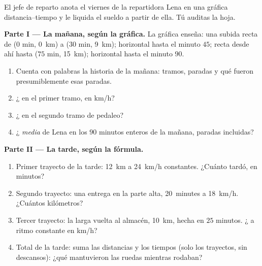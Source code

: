 \begin{problem}\label{pb:g7:motion-average-speed:1}
El jefe de reparto anota el viernes de la repartidora Lena en una
gráfica distancia--tiempo y le liquida el sueldo a partir de ella. Tú
auditas la hoja.

\medskip\noindent\textbf{Parte I --- La mañana, según la gráfica.}
La gráfica enseña: una subida recta de ($0$ min, \qty{0}{km}) a ($30$
min, \qty{9}{km}); horizontal hasta el minuto $45$; recta desde ahí
hasta ($75$ min, \qty{15}{km}); horizontal hasta el minuto $90$.
\begin{enumerate}
  \item Cuenta con palabras la historia de la mañana: tramos,
        paradas y qué fueron presumiblemente esas paradas.
  \item ¿ en el primer tramo, en \unit{km/h}?
  \item ¿ en el segundo tramo de pedaleo?
  \item ¿ \emph{media} de Lena en los $90$ minutos
        enteros de la mañana, paradas incluidas?
\end{enumerate}

\medskip\noindent\textbf{Parte II --- La tarde, según la fórmula.}
\begin{enumerate}[resume]
  \item Primer trayecto de la tarde: \qty{12}{km} a \qty{24}{km/h}
        constantes. ¿Cuánto tardó, en minutos?
  \item Segundo trayecto: una entrega en la parte alta,
        \qty{20}{minutes} a \qty{18}{km/h}. ¿Cuántos kilómetros?
  \item Tercer trayecto: la larga vuelta al almacén, \qty{10}{km},
        hecha en $25$ minutos. ¿ a ritmo constante en
        \unit{km/h}?
  \item Total de la tarde: suma las distancias y los tiempos (solo
        los trayectos, sin descansos): ¿qué 
        mantuvieron las ruedas mientras rodaban?
\end{enumerate}


\end{problem}
